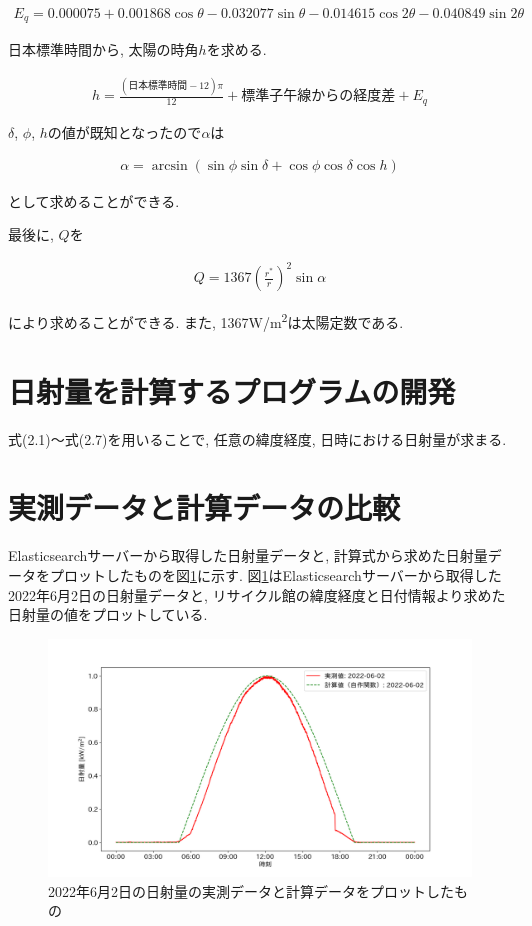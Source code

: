 \begin{eqnarray}
  E_q =  0.000075+0.001868\cos \theta-0.032077\sin \theta-0.014615\cos 2\theta-0.040849\sin 2\theta
\end{eqnarray}

日本標準時間から, 太陽の時角$h$を求める.

\begin{eqnarray}
  h = \frac{(日本標準時間-12)\pi}{12}+標準子午線からの経度差+E_q
\end{eqnarray}

$\delta$, $\phi$, $h$の値が既知となったので$\alpha$は

\begin{eqnarray}
  \alpha = \arcsin (\sin \phi\sin \delta+\cos \phi\cos \delta\cos h)
\end{eqnarray}

として求めることができる.

最後に, $Q$を

\begin{eqnarray}
  Q = 1367(\frac{r^{*}}{r})^{2}\sin \alpha
\end{eqnarray}

により求めることができる.
また, 1367\si{\watt}/\si{\metre\squared}は太陽定数である.

\section{日射量を計算するプログラムの開発}
式(2.1)～式(2.7)を用いることで, 任意の緯度経度, 日時における日射量が求まる.


\section{実測データと計算データの比較}
Elasticsearchサーバーから取得した日射量データと, 計算式から求めた日射量データをプロットしたものを図\ref{20220529-p1}に示す.
図\ref{20220529-p1}はElasticsearchサーバーから取得した2022年6月2日の日射量データと, リサイクル館の緯度経度と日付情報より求めた日射量の値をプロットしている.

\begin{figure}[h]
  \begin{center}
    \includegraphics[width=160mm]{sotu/figure/2/original-20220602-corr.png}
    \caption{2022年6月2日の日射量の実測データと計算データをプロットしたもの}
    \label{20220529-p1}
  \end{center}
\end{figure}

